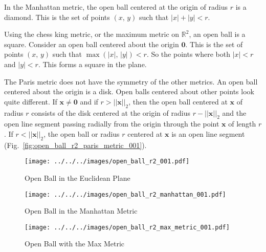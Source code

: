 \documentclass{article}
\theoremstyle{plain}
\theoremstyle{normal}
\newenvironment{example}{%
    \pushQED{\qed}\renewcommand{\qedsymbol}{$\blacksquare$}\examplex%
}{%
    \popQED\endexamplex%
}
\begin{document}
        \begin{example}
            In the Manhattan metric, the open ball centered at the origin of
            radius $r$ is a diamond. This is the set of points
            $(x,\,y)$ such that $|x|+|y|<r$.
        \end{example}
        \begin{example}
            Using the chess king metric, or the maximum metric on
            $\mathbb{R}^{2}$, an open ball is a square. Consider an open ball
            centered about the origin $\mathbf{0}$. This is the set of points
            $(x,\,y)$ such that $\max(|x|,\,|y|)<r$. So the points where both
            $|x|<r$ and $|y|<r$. This forms a square in the plane.
        \end{example}
        \begin{example}
            The Paris metric does not have the symmetry of the other metrics.
            An open ball centered about the origin is a disk. Open balls
            centered about other points look quite different. If
            $\mathbf{x}\ne\mathbf{0}$ and if $r>||\mathbf{x}||_{2}$, then
            the open ball centered at $\mathbf{x}$ of radius $r$ consists of
            the disk centered at the origin of radius
            $r-||\mathbf{x}||_{2}$ and the open line segment passing radially
            from the origin through the point $\mathbf{x}$
            of length $r$. If $r<||\mathbf{x}||_{2}$, the open ball or radius
            $r$ centered at $\mathbf{x}$ is an open line segment
            (Fig.~\ref{fig:open_ball_r2_paris_metric_001}).
        \end{example}
        \begin{figure}
            \centering
            \texttt{[image: ../../../images/open\_ball\_r2\_001.pdf]}
            \caption{Open Ball in the Euclidean Plane}
            \label{fig:open_ball_r2_001}
        \end{figure}
        \begin{figure}
            \centering
            \texttt{[image: ../../../images/open\_ball\_r2\_manhattan\_001.pdf]}
            \caption{Open Ball in the Manhattan Metric}
            \label{fig:open_ball_r2_manhattan_001}
        \end{figure}
        \begin{figure}
            \centering
            \texttt{[image: ../../../images/open\_ball\_r2\_max\_metric\_001.pdf]}
            \caption{Open Ball with the Max Metric}
            \label{fig:open_ball_r2_max_metric_001}
        \end{figure}
\end{document}
